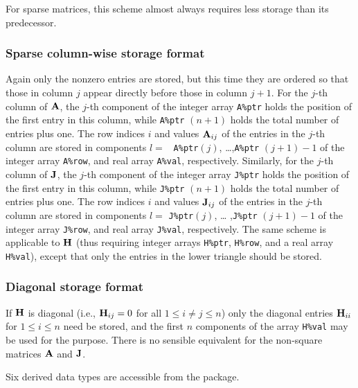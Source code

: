 \documentclass{galahad}
\begin{document}
For sparse matrices, this scheme almost always requires less storage than 
its predecessor.

\subsubsection{Sparse column-wise storage format}\label{columnwise}
Again only the nonzero entries are stored, but this time they are
ordered so that those in column $j$ appear directly before those in
column $j+1$. For the $j$-th column of ${\mathbf{A}}$, the $j$-th component of
the integer array {\tt A\%ptr} holds the position of the first entry in
this column, while {\tt A\%ptr} $(n+1)$ holds the total number of
entries plus one.  The row indices $i$ and values ${\mathbf{A}}_{ij}$ of the
entries in the $j$-th column are stored in components $l =$ {\tt
  A\%ptr}$(j)$, \ldots ,{\tt A\%ptr} $(j+1)-1$ of the integer array
{\tt A\%row}, and real array {\tt A\%val}, respectively.  Similarly,
for the $j$-th column of ${\mathbf{J}}$, the $j$-th component of the integer array
{\tt J\%ptr} holds the position of the first entry in this column,
while {\tt J\%ptr} $(n+1)$ holds the total number of entries plus one.
The row indices $i$ and values ${\mathbf{J}}_{ij}$ of the entries in the
$j$-th column are stored in components $l =$ {\tt J\%ptr}$(j)$, \ldots
,{\tt J\%ptr} $(j+1)-1$ of the integer array {\tt J\%row}, and real
array {\tt J\%val}, respectively.  The same scheme is applicable to
${\mathbf{H}}$ (thus requiring integer arrays {\tt H\%ptr}, {\tt H\%row}, and
a real array {\tt H\%val}), except that only the entries in the lower
triangle should be stored.

\subsubsection{Diagonal storage format}\label{diagonal}
If ${\mathbf{H}}$ is diagonal (i.e., ${\mathbf{H}}_{ij} = 0$ for all $1 \leq i \neq j \leq n$)
only the diagonal entries ${\mathbf{H}}_{ii}$ for $1 \leq i \leq n$ need be stored,
and the first $n$ components of the array {\tt H\%val} may be used for 
the purpose. There is no sensible equivalent for the non-square
matrices ${\mathbf{A}}$ and ${\mathbf{J}}$.





\galtypes
Six derived data types are accessible from the package.
\end{document}
